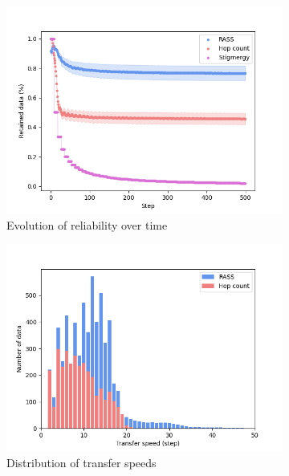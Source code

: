 \documentclass[letterpaper, 10 pt, conference]{ieeeconf}
\begin{document}
\begin{figure}
    \centering
    \begin{subfigure}{0.30\textwidth}
        \includegraphics[width=\textwidth]{figures/grid_reliability.png}
        \caption{Evolution of reliability over time}
        \label{results:grid_100_reliability}
    \end{subfigure}
    \begin{subfigure}{0.30\textwidth}
        \includegraphics[width=\textwidth]{figures/grid_speed.png}
        \caption{Distribution of transfer speeds}
        \label{results:grid_100_speed}
    \end{subfigure}
    \begin{subfigure}{0.30\textwidth}

\end{subfigure}
\end{figure}
\end{document}
